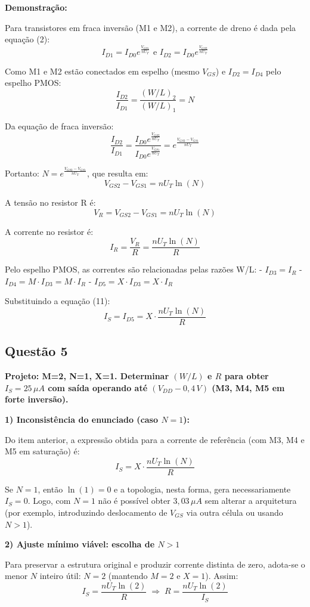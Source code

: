 \documentclass[12pt,a4paper]{article}
\begin{document}
\t\textbf{Demonstração:}

Para transistores em fraca inversão (M1 e M2), a corrente de dreno é dada pela equação (2):
$$I_{D1} = I_{D0} e^{\frac{V_{GS1}}{nU_T}} \text{ e } I_{D2} = I_{D0} e^{\frac{V_{GS2}}{nU_T}}$$

Como M1 e M2 estão conectados em espelho (mesmo $V_{GS}$) e $I_{D2} = I_{D4}$ pelo espelho PMOS:
$$\frac{I_{D2}}{I_{D1}} = \frac{(W/L)_2}{(W/L)_1} = N$$

Da equação de fraca inversão:
$$\frac{I_{D2}}{I_{D1}} = \frac{I_{D0} e^{\frac{V_{GS2}}{nU_T}}}{I_{D0} e^{\frac{V_{GS1}}{nU_T}}} = e^{\frac{V_{GS2} - V_{GS1}}{nU_T}}$$

Portanto: $N = e^{\frac{V_{GS2} - V_{GS1}}{nU_T}}$, que resulta em:
$$V_{GS2} - V_{GS1} = nU_T \ln(N) $$

A tensão no resistor R é:
$$V_R = V_{GS2} - V_{GS1} = nU_T \ln(N)$$

A corrente no resistor é:
$$I_R = \frac{V_R}{R} = \frac{nU_T \ln(N)}{R} $$

Pelo espelho PMOS, as correntes são relacionadas pelas razões W/L:
- $I_{D3} = I_R$
- $I_{D4} = M \cdot I_{D3} = M \cdot I_R$ 
- $I_{D5} = X \cdot I_{D3} = X \cdot I_R$

Substituindo a equação (11):
$$I_S = I_{D5} = X \cdot \frac{nU_T \ln(N)}{R} $$

\subsection*{Questão 5}
	\textbf{Projeto: M=2, N=1, X=1. Determinar $(W/L)$ e $R$ para obter $I_S = 25\,\mu A$ com saída operando até $(V_{DD} - 0{,}4\,V)$ (M3, M4, M5 em forte inversão).}

	\textbf{1) Inconsistência do enunciado (caso $N=1$):}

Do item anterior, a expressão obtida para a corrente de referência (com M3, M4 e M5 em saturação) é:
$$ I_S = X \cdot \frac{n U_T \ln(N)}{R} $$

Se $N = 1$, então $\ln(1)=0$ e a topologia, nesta forma, gera necessariamente $I_S = 0$. Logo, com $N=1$ não é possível obter $3{,}03\,\mu A$ sem alterar a arquitetura (por exemplo, introduzindo deslocamento de $V_{GS}$ via outra célula ou usando $N>1$).

	\textbf{2) Ajuste mínimo viável: escolha de $N>1$}

Para preservar a estrutura original e produzir corrente distinta de zero, adota-se o menor $N$ inteiro útil: $N=2$ (mantendo $M=2$ e $X=1$). Assim:
$$ I_S = \frac{n U_T \ln(2)}{R} \;\Longrightarrow\; R = \frac{n U_T \ln(2)}{I_S} $$
\end{document}
